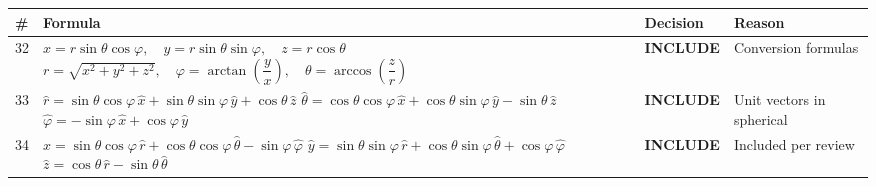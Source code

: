 \documentclass[11pt,a4paper]{article}
\newcommand{\inc}{\textbf{\textcolor{incgreen}{INCLUDE}}}
\begin{document}
\begin{longtable}{p{0.5cm} p{7.5cm} p{2.2cm} p{3.5cm}}
\toprule
\# & Formula & Decision & Reason \\
\midrule
\endhead
32 & $x = r\sin\theta\cos\varphi,\quad y = r\sin\theta\sin\varphi,\quad z = r\cos\theta$ \newline
   $r = \sqrt{x^2+y^2+z^2},\quad \varphi = \arctan\!\left(\dfrac{y}{x}\right),\quad \theta = \arccos\!\left(\dfrac{z}{r}\right)$ & \inc & Conversion formulas \\[14pt]
33 & $\hat{r} = \sin\theta\cos\varphi\,\hat{x} + \sin\theta\sin\varphi\,\hat{y} + \cos\theta\,\hat{z}$ \newline
   $\hat{\theta} = \cos\theta\cos\varphi\,\hat{x} + \cos\theta\sin\varphi\,\hat{y} - \sin\theta\,\hat{z}$ \newline
   $\hat{\varphi} = -\sin\varphi\,\hat{x} + \cos\varphi\,\hat{y}$ & \inc & Unit vectors in spherical \\[14pt]
34 & $\hat{x} = \sin\theta\cos\varphi\,\hat{r} + \cos\theta\cos\varphi\,\hat{\theta} - \sin\varphi\,\hat{\varphi}$ \newline
   $\hat{y} = \sin\theta\sin\varphi\,\hat{r} + \cos\theta\sin\varphi\,\hat{\theta} + \cos\varphi\,\hat{\varphi}$ \newline
   $\hat{z} = \cos\theta\,\hat{r} - \sin\theta\,\hat{\theta}$ & \inc & Included per review \\[6pt]
\bottomrule
\end{longtable}
\end{document}

